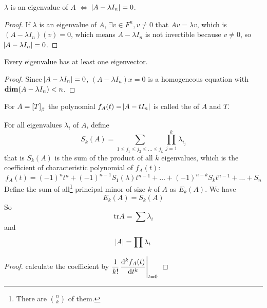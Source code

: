 \begin{theorem}
    $\lambda$ is an eigenvalue of $A$ $\iff$ $\abs{A - \lambda I_n} = 0$.
\end{theorem}

\begin{proof}
    If $\lambda$ is an eigenvalue of $A$, $\exists v \in F^n, v \neq 0$ that $A v = \lambda v$, which is $(A - \lambda I_n)(v)= 0$, which means $A - \lambda I_n$ is not invertible because $v \neq 0$, so $\abs{A - \lambda I_n} = 0$.
\end{proof}

\begin{theorem}
    Every eigenvalue has at least one eigenvector.    
\end{theorem}
\begin{proof}
    Since $\abs{A - \lambda I_n} = 0$, $(A - \lambda I_n) x = 0$ is a homogeneous equation with $\dimension{A - \lambda I_n} < n$.
\end{proof}



\begin{definition}
    For $A = \coordinate{T}_\beta$ the polynomial $f_A(t) = \abs{A - t I_n}$ is called the  of $A$ and $T$. 
\end{definition}

\begin{theorem}
    For all eigenvalues $\lambda_i$ of $A$, define 
    \begin{equation}
        S_k(A) = \sum_{1\leq j_1 \leq j_2 \leq \dots \leq j_k} \prod_{j=1}^k \lambda_{i_j}
    \end{equation}
    that is $S_k(A)$ is the sum of the product of all $k$ eigenvalues, which is the coefficient of characteristic polynomial of $f_A(t)$:
    \begin{equation}
        f_A(t) = (-1)^n t^n + (-1)^{n-1} S_{1}(\lambda)t^{n-1} + \dots + (-1)^{n-k} S_{k} t^{n-1} + \dots + S_{n}
    \end{equation}
    Define the sum of all\footnote{There are $\binom{n}{k}$ of them.} principal minor of size $k$ of $A$ as $E_k(A)$. We have
    \begin{equation}
        E_k(A) = S_k(A)
    \end{equation}
    So 
    \begin{equation}
        \text{tr} A = \sum \lambda_i
    \end{equation}
    and 
    \begin{equation}
        \abs{A} = \prod \lambda_i
    \end{equation}
\end{theorem}
\begin{proof}
    calculate the coefficient by $\dfrac{1}{k!} \eval{\dod[k]{f_A(t)}{t}}_{t = 0}$
\end{proof}



